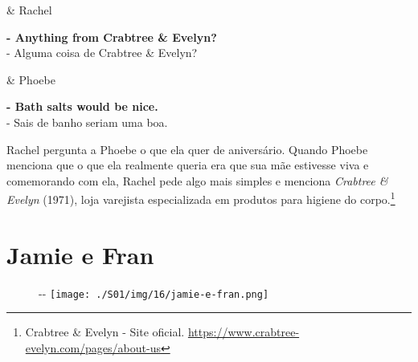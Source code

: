 \begin{tcolorbox}[enhanced,center upper,
    drop fuzzy shadow southeast, boxrule=0.3pt,
    lower separated=false, breakable,
    colframe=black!30!dialogoBorder,colback=white]
\begin{minipage}[c]{0.16\linewidth}
   & \centering \scriptsize{Rachel}
\end{minipage}
\hfill
\begin{minipage}[c]{0.8\linewidth}
  \textbf{- Anything from Crabtree \& Evelyn?}\\
  - Alguma coisa de Crabtree \& Evelyn?
\end{minipage}

\medskip
\begin{minipage}[c]{0.16\linewidth}
   & \centering \scriptsize{Phoebe}
\end{minipage}
\hfill
\begin{minipage}[c]{0.8\linewidth}
  \textbf{- Bath salts would be nice.}\\
  - Sais de banho seriam uma boa.
\end{minipage}
\end{tcolorbox}

Rachel pergunta a Phoebe o que ela quer de aniversário. Quando Phoebe
menciona que o que ela realmente queria era que sua mãe estivesse viva e
comemorando com ela, Rachel pede algo mais simples e menciona
\emph{Crabtree \& Evelyn} (1971), loja varejista especializada em
produtos para higiene do corpo.\footnote{\sloppy Crabtree \& Evelyn - Site oficial. \url{https://www.crabtree-evelyn.com/pages/about-us}}

\hypertarget{jamie-e-fran}{%
\section{Jamie e Fran}\label{jamie-e-fran}}

\begin{figure}[!ht]
  \begin{adjustwidth}{-\oddsidemargin-1in}{-\rightmargin}
    \centering
    \texttt{[image: ./S01/img/16/jamie-e-fran.png]}
  \end{adjustwidth}
\end{figure}

